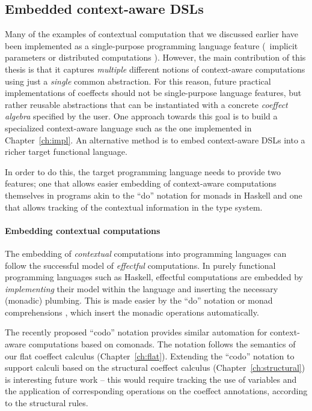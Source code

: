 \subsection{Embedded context-aware DSLs}
\label{sec:further-impl}

Many of the examples of contextual computation that we discussed earlier have been implemented as
a single-purpose programming language feature (\eg~implicit parameters \cite{app-implicit-parameters}
or distributed computations \cite{app-distributed-ml5,app-distributed-links}). However,
the main contribution of this thesis is that it captures
\emph{multiple} different notions of context-aware computations using just a \emph{single}
common abstraction. For this reason, future practical implementations of coeffects should not be
single-purpose language features, but rather reusable abstractions that
can be instantiated with a concrete \emph{coeffect algebra} specified by the user.
One approach towards this goal is to build a specialized context-aware language such as the
one implemented in Chapter~\ref{ch:impl}. An alternative method is to embed context-aware
DSLs into a richer target functional language.

In order to do this, the target programming language needs to provide two features; one that allows
easier embedding of context-aware computations themselves in programs akin to the ``do'' notation
for monads in Haskell and one that allows tracking of the contextual information in the type system.


\paragraph{Embedding contextual computations}

The embedding of \emph{contextual} computations into programming languages can follow the successful
model of \emph{effectful} computations. In purely functional programming languages such as Haskell,
effectful computations are embedded by \emph{implementing} their model within the language
and inserting the necessary (monadic) plumbing. This is made easier by the ``do'' notation or
monad comprehensions \cite{other-haskell98,monads-compre}, which insert the monadic operations
automatically.

The recently proposed ``codo'' notation \cite{comonads-codo} provides similar automation for
context-aware computations based on comonads. The notation follows the semantics of our
flat coeffect calculus (Chapter~\ref{ch:flat}). Extending the ``codo'' notation to support calculi based
on the structural coeffect calculus (Chapter~\ref{ch:structural}) is interesting future work --
this would require tracking the use of variables and the application of corresponding operations
on the coeffect annotations, according to the structural rules.

